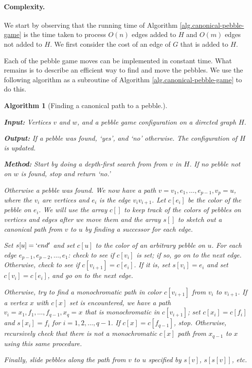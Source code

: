 \documentclass[11pt]{article}
\newtheorem{algorithm}[theorem]{Algorithm}
\newcommand{\refalg}[1]{Algorithm \ref{alg.#1}}
\newcommand{\labelalg}[1]{\label{alg.#1}}
\begin{document}
	\paragraph{Complexity.} We start by observing that the running time of \refalg{canonical-pebble-game} is the time taken to process $O(n)$ edges added to $H$ and $O(m)$ edges not added to $H$. We first consider the cost of an edge of $G$ that is added to $H$.

	Each of the pebble game moves can be implemented in constant time. 
	What remains is to describe an efficient way to find and move the pebbles.  We use the 
	following algorithm as a subroutine of \refalg{canonical-pebble-game} to do this.
	
	\begin{algorithm}
		[Finding a canonical path to a pebble.]\labelalg{find-one-pebble}

		{\bf Input:} Vertices $v$ and $w$, and a pebble game configuration on a directed graph $H$.

		{\bf Output:} If a pebble was found, `yes', and `no' otherwise. The configuration of $H$ is updated.

		{\bf Method:}
		Start by doing a depth-first search from from $v$ in $H$. If no pebble not on $w$ is found, stop and return `no.'

		Otherwise a pebble was found.  We now have a path $v=v_{1},e_{1},\ldots,e_{p-1},v_{p}=u$, where the $v_{i}$ are vertices and $e_{i}$ is the edge $v_{i}v_{i+1}$. Let $c[e_{i}]$ be the color of the pebble on $e_{i}$.  We will use the array $c[]$ to keep track of the colors of pebbles on vertices and edges 
		after we move them and the array $s[]$ to sketch out a canonical path from 
		$v$ to $u$ by finding a successor for each edge.

		Set $s[u]=`end'$ and set $c[u]$ to the color of an arbitrary pebble on $u$. For each edge $e_{p-1},e_{p-2},\ldots,e_{1}$: check to see if $c[v_{i}]$ is set; if so, go on to the next edge. Otherwise, check to see if $c[v_{i+1}]=c[e_{i}]$. If it is, set $s[v_{i}]=e_{i}$ and set $c[v_{i}]=c[e_{i}]$, and go on to the next edge.

		Otherwise, try to find a monochromatic path in color $c[v_{i+1}]$ from $v_{i}$ to $v_{i+1}$. If a vertex $x$ with $c[x]$ set is encountered, we have a path $v_{i}=x_{1},f_{1},\ldots,f_{q-1},x_{q}=x$ that is monochromatic in $c[v_{i+1}]$; set $c[x_{i}]=c[f_{i}]$ and $s[x_{i}]=f_{i}$ for $i=1,2,\ldots,q-1$. If $c[x]=c[f_{q-1}]$, stop. Otherwise, recursively check that there is not a monochromatic $c[x]$ path from $x_{q-1}$ to $x$ using this same procedure.

		Finally, slide pebbles along the path from $v$ to $u$ specified by $s[v]$, $s[s[v]]$, etc.
	\end{algorithm}
\end{document}

